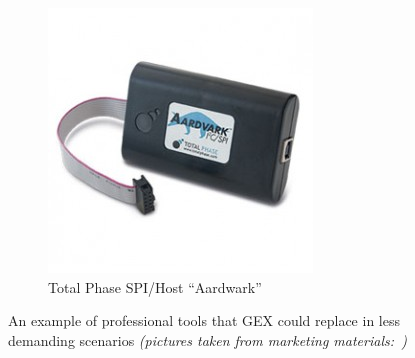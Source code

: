 \begin{figure}[h]
\begin{subfigure}{.5\textwidth}
		\includegraphics[width=.95\linewidth]{img/total-phase-spi-i2c.jpg}
		\caption{Total Phase SPI/\IIC Host ``Aardwark''}
	\end{subfigure}
	\caption[Professional tools that GEX can replace]{\label{fig:profidaq}An example of professional tools that GEX could replace in less demanding scenarios \textit{(pictures taken from marketing materials:~\cite{nidevice1, nidevice2, tphasedevice})}}
\end{figure}

